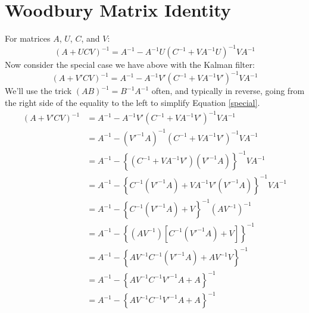 \documentclass[a4paper,12pt]{scrartcl}
\begin{document}
\newpage
\appendix

\section{Woodbury Matrix Identity}

For matrices $A$, $U$, $C$, and $V$:
\begin{equation}
    (A+UCV)^{-1} = A^{-1} - A^{-1} U(C^{-1} + VA^{-1}U)^{-1}
	VA^{-1}
\end{equation}
Now consider the special case we have above with the
Kalman filter:
\begin{equation}
    \label{special}
    (A + V'CV)^{-1} = A^{-1} - A^{-1} V'(C^{-1} + VA^{-1}V')^{-1}
	VA^{-1}
\end{equation}
We'll use the trick $(AB)^{-1} = B^{-1} A^{-1}$ often, and
typically in reverse, going from the right side of the equality
to the left to simplify Equation \ref{special}.
\begin{align*}
    (A + V'CV)^{-1} &= A^{-1}-A^{-1} V'(C^{-1} + VA^{-1}V')^{-1}
	VA^{-1} \\
    &= A^{-1}- \left(V'^{-1} A\right)^{-1} 
	(C^{-1} + VA^{-1}V')^{-1} VA^{-1} \\
    &= A^{-1}- \left\{  (C^{-1} + VA^{-1}V')
	\left(V'^{-1} A\right)\right\}^{-1} VA^{-1} \\
    &= A^{-1}- \left\{C^{-1} \left(V'^{-1} A\right)
	+ VA^{-1}V' \left(V'^{-1} A\right)\right\}^{-1}
	 VA^{-1} \\
    &= A^{-1}- \left\{C^{-1} \left(V'^{-1} A\right)
	+ V\right\}^{-1}
	 \left(AV^{-1}\right)^{-1} \\
    &= A^{-1}- \left\{\left(AV^{-1}\right) 
	\left[C^{-1} \left(V'^{-1} A\right)
	+ V\right]\right\}^{-1} \\
    &= A^{-1}- \left\{AV^{-1} 
	C^{-1} \left(V'^{-1} A\right)
	+ AV^{-1}V\right\}^{-1} \\
    &= A^{-1}- \left\{AV^{-1} 
	C^{-1} V'^{-1} A
	+ A\right\}^{-1} \\
    &= A^{-1}- \left\{AV^{-1} 
	C^{-1} V'^{-1} A
	+ A\right\}^{-1} \\
\end{align*}
\end{document}
